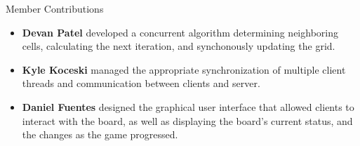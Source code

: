 \documentclass[final]{beamer}
\newlength{\onecolwid}
\begin{document}
\begin{frame}[t]
\begin{columns}[t]
\begin{column}{\onecolwid}
\begin{block}{Member Contributions}

\begin{itemize}
\item \textbf{Devan Patel} developed a concurrent algorithm determining neighboring cells, calculating the next iteration, and synchonously updating the grid.
\item\textbf{Kyle Koceski} managed the appropriate synchronization of multiple client threads and communication between clients and server.
\item\textbf{Daniel Fuentes} designed the graphical user interface that allowed clients to interact with the board, as well as displaying the board's current status, and the changes as the game progressed.
\end{itemize}
\end{block}


\end{column} %

\end{columns} %

\end{frame} %
\end{document}
